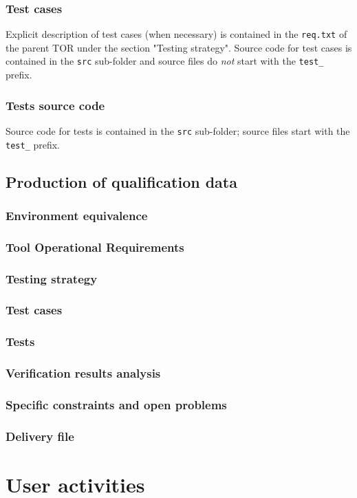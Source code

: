 \documentclass {report}
\begin{document}
\subsection{Test cases}
Explicit description of test cases (when necessary) is contained in the \texttt{req.txt} of the parent TOR under the section "Testing strategy". Source code for test cases is contained in the \texttt{src} sub-folder and source files do \emph{not} start with the \texttt{test\_} prefix. 

\subsection{Tests source code}
Source code for tests is contained in the \texttt{src} sub-folder; source files start with the \texttt{test\_} prefix. 

\section{Production of qualification data}
\subsection{Environment equivalence}
\subsection{Tool Operational Requirements}
\subsection{Testing strategy}
\subsection{Test cases}
\subsection{Tests}
\subsection{Verification results analysis}
\subsection{Specific constraints and open problems}
\subsection{Delivery file}

\chapter{User activities}
\label{sec:user-act}
\end{document}
